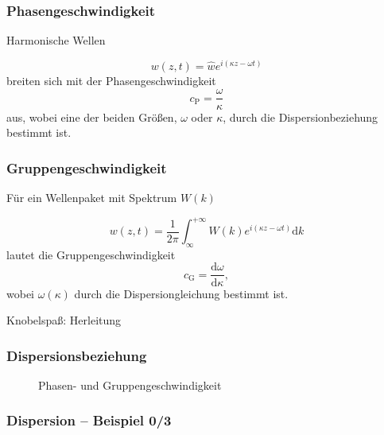 \begin{frame}
\frametitle{Phasengeschwindigkeit}
Harmonische Wellen \hfill

 \begin{equation*}
  w(z,t)=\hat{w} e^{i(\kappa z-\omega t)}
 \end{equation*}
 breiten sich mit der Phasengeschwindigkeit
 \begin{equation*}
  c_\mathrm{P}=\frac{\omega}{\kappa}
 \end{equation*}
 aus, 
wobei eine der beiden Größen, $\omega$ oder $\kappa$, durch die Dispersionbeziehung bestimmt ist.
\end{frame}


\begin{frame}
\frametitle{Gruppengeschwindigkeit}
Für ein Wellenpaket mit Spektrum $W(k)$ \hfill

\begin{equation*}
  w(z,t)=\frac{1}{2\pi}\int_\infty^{+\infty} W(k)e^{i(\kappa z-\omega t)}\mathrm{d}k
 \end{equation*}
 lautet die Gruppengeschwindigkeit
 \begin{equation*}
  c_\mathrm{G}=\frac{\mathrm{d}\omega}{\mathrm{d}\kappa},
 \end{equation*}
wobei $\omega(\kappa)$ durch die Dispersiongleichung bestimmt ist.

\vfill
Knobelspaß: Herleitung 
\end{frame}


\begin{frame}
\frametitle{Dispersionsbeziehung}
\begin{figure}

\caption*{Phasen- und Gruppengeschwindigkeit}
\end{figure}
\end{frame}


\begin{frame}
\frametitle{Dispersion -- Beispiel 0/3} 

\end{frame}



